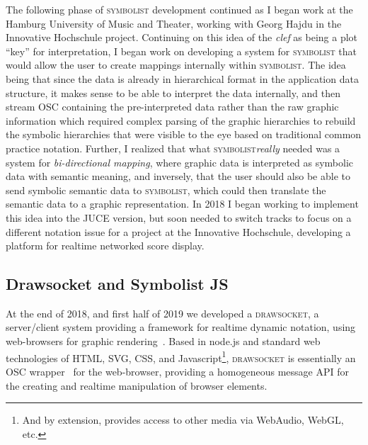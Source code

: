 \documentclass{article}
\def\symbolist{\textsc{symbolist}\xspace}
\def\drawsocket{\textsc{drawsocket}\xspace}
\begin{document}
The following phase of \symbolist development continued as I began work at the Hamburg University of Music and Theater, working with Georg Hajdu in the Innovative Hochschule project. Continuing on this idea of the \textit{clef} as being a plot ``key'' for interpretation, I began work on developing a system for \symbolist that would allow the user to create mappings internally within \symbolist. The idea being that since the data is already in hierarchical format in the application data structure, it makes sense to be able to interpret the data internally, and then stream OSC containing the pre-interpreted data rather than the raw graphic information which required complex parsing of the graphic hierarchies to rebuild the symbolic hierarchies that were visible to the eye based on traditional common practice notation. Further, I realized that what \symbolist \textit{really} needed was a system for \textit{bi-directional mapping}, where graphic data is interpreted as symbolic data with semantic meaning, and inversely, that the user should also be able to send symbolic semantic data to \symbolist, which could then translate the semantic data to a graphic representation. In 2018 I began working to implement this idea into the JUCE version, but soon needed to switch tracks to focus on a different notation issue for a project at the Innovative Hochschule, developing a platform for realtime networked score display.

\subsection*{Drawsocket and Symbolist JS}\label{sec:drawsocket}

At the end of 2018, and first half of 2019 we developed a \drawsocket, a server/client system providing a framework for realtime dynamic notation, using web-browsers for graphic rendering~\cite{gottfried2019drawsocket, hajdu2005quintet}. Based in node.js and standard web technologies of HTML, SVG, CSS, and Javascript\footnote{And by extension, provides access to other media via WebAudio, WebGL, etc.}, \drawsocket is essentially an OSC wrapper~\cite{freed2014io} for the web-browser, providing a homogeneous message API for the creating and realtime manipulation of browser elements.
\end{document}
